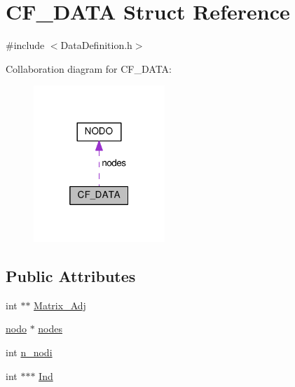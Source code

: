 \hypertarget{structCF__DATA}{\section{C\-F\-\_\-\-D\-A\-T\-A Struct Reference}
\label{structCF__DATA}
}


{\ttfamily \#include $<$Data\-Definition.\-h$>$}



Collaboration diagram for C\-F\-\_\-\-D\-A\-T\-A\-:
\nopagebreak
\begin{figure}[H]
\begin{center}
\leavevmode
\includegraphics[width=140pt]{structCF__DATA__coll__graph}
\end{center}
\end{figure}
\subsection*{Public Attributes}
\begin{DoxyCompactItemize}
\item 
int $\ast$$\ast$ \hyperlink{structCF__DATA_a33150ceb864cb8ff1fcf8bfbb2d01efe}{Matrix\-\_\-\-Adj}
\item 
\hyperlink{DataDefinition_8h_a65ad3efc6589d7d39f5a6813fd74a7d2}{nodo} $\ast$ \hyperlink{structCF__DATA_aa790d2fc6304b584e3d6a5afb95cf5c4}{nodes}
\item 
int \hyperlink{structCF__DATA_a50c302ea5a7570881d844eb0b2a6c930}{n\-\_\-nodi}
\item 
int $\ast$$\ast$$\ast$ \hyperlink{structCF__DATA_a21b2ca110fc0b01950a783ef9e9c2628}{Ind}
\end{DoxyCompactItemize}


